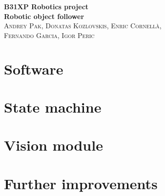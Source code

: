 \documentclass[11pt]{article}
\begin{document}
   \begin{center}
     {\huge\bfseries B31XP Robotics project\\ Robotic object follower}\\
      \vspace{2ex}
      \textsc{Andrey Pak, Donatas Kozlovskis, Enric Cornellà,\\ Fernando Garcia,  Igor Peric}
   \end{center}
   \vspace{2ex}%

\begin{abstract}
This project presents a small, easy to build low-cost robot system, that is able to find coloured signs on the floor and implement the associated actions, e.g. stop, turn, pause, etc.
The robot hardware uses Raspberry Pi to control a set of motors, sensors and servo actuators. 
Report provides information about done review the hardware design and implementation of software using open source tools as C++ and OpenCV libraries. 
\end{abstract}
 
\section{Software}



\section{State machine}



\section{Vision module}



\section{Further improvements}



\clearpage
\end{document}
